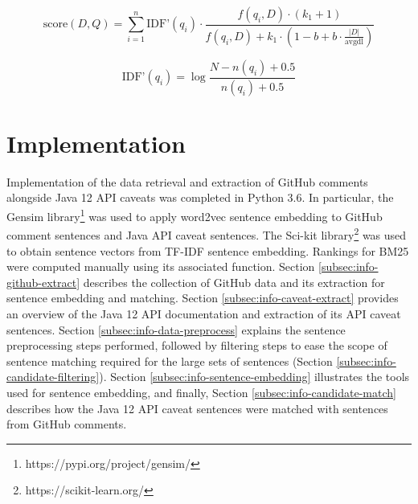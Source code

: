 \begin{equation} \label{eq:bm25} 
\text{score}(D,Q) = \sum_{i=1}^{n} \text{IDF'}(q_i) \cdot \frac{f(q_i, D) \cdot (k_1 + 1)}{f(q_i, D) + k_1 \cdot (1 - b + b \cdot \frac{|D|}{\text{avgdl}})} 
\end{equation}

\begin{equation} \label{eq:bm25-idf} 
\text{IDF'}(q_i) = \log{\frac{N - n(q_i) + 0.5}{n(q_i) + 0.5}}
\end{equation}

\section{Implementation}
\label{sec:info-implement}
Implementation of the data retrieval and extraction of GitHub comments alongside Java 12 API caveats was completed in Python 3.6. In particular, the Gensim library\footnote{https://pypi.org/project/gensim/} was used to apply word2vec sentence embedding to GitHub comment sentences and Java API caveat sentences. The Sci-kit library\footnote{https://scikit-learn.org/} was used to obtain sentence vectors from TF-IDF sentence embedding. Rankings for BM25 were computed manually using its associated function. Section \ref{subsec:info-github-extract} describes the collection of GitHub data and its extraction for sentence embedding and matching. Section \ref{subsec:info-caveat-extract} provides an overview of the Java 12 API documentation and extraction of its API caveat sentences. Section \ref{subsec:info-data-preprocess} explains the sentence preprocessing steps performed, followed by filtering steps to ease the scope of sentence matching required for the large sets of sentences (Section \ref{subsec:info-candidate-filtering}). Section \ref{subsec:info-sentence-embedding} illustrates the tools used for sentence embedding, and finally, Section \ref{subsec:info-candidate-match} describes how the Java 12 API caveat sentences were matched with sentences from GitHub comments.

